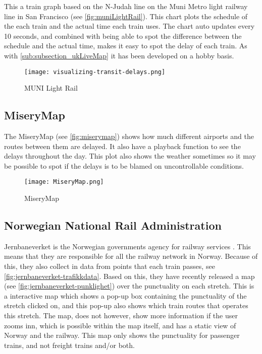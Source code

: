 This a train graph based on the N-Judah line on the Muni Metro light railway line in San Francisco (see \vref{fig:muniLightRail}). 
This chart plots the schedule of the each train and the actual time each train 
uses. The chart auto updates every 10 seconds, and combined with being able 
to spot the difference between the schedule and the actual time, makes it easy 
to spot the delay of each train. As with \vref{sub:subsection_ukLiveMap} it 
has been developed on a hobby basis.

\begin{figure}[!htbp]
	\texttt{[image: visualizing-transit-delays.png]}
	\caption[MUNI Light Rail]{MUNI Light Rail \cite{muniLightRail}}
	\label{fig:muniLightRail}
\end{figure}
\pagebreak


\clearpage
\subsection{MiseryMap}
\label{sub:subsection_zugmonitor}

The MiseryMap (see \vref{fig:miserymap}) shows how much different airports and 
the routes between them are delayed. It also have a playback function to see 
the delays throughout the day. This plot also shows the weather sometimes so it
may be possible to spot if the delays is to be blamed on uncontrollable
conditions. 

\begin{figure}[!htbp]
	\texttt{[image: MiseryMap.png]}
	\caption[MiseryMap]{MiseryMap \cite{flightAware:MiseryMap}}
	\label{fig:miserymap}
\end{figure}
 
\clearpage
\subsection{Norwegian National Rail Administration}
\label{sub:subsection_jernbaneverket}

Jernbaneverket is the Norwegian governments agency for railway services \cite{jernbaneverketAbout}.
This means that they are responsible for all the railway network in Norway.
Because of this, they also collect in data from points that each train passes, see \vref{fig:jernbaneverket-trafikkdata}. 
Based on this, they have recently released a map (see \vref{fig:jernbaneverket-punklighet}) over the punctuality on each stretch. This is a 
interactive map which shows a pop-up box containing the punctuality of the 
stretch clicked on, and this pop-up also shows which train routes that
operates this stretch. The map, does not however, show more information if 
the user zooms inn, which is possible within the map itself, and has a static 
view of Norway and the railway. This map only shows the punctuality for 
passenger trains, and not freight trains and/or both.\\ 

